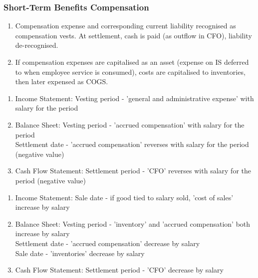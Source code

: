\subsubsection{Short-Term Benefits Compensation}

\begin{method} 
\begin{enumerate}[label=\roman*.]
\setlength{\itemsep}{0pt}
\item Compensation expense and corresponding current liability recognised as compensation vests. At settlement, cash is paid (as outflow in CFO), liability de-recognised.
\item If compensation expenses are capitalised as an asset (expense on IS deferred to when employee service is consumed), costs are capitalised to inventories, then later expensed as COGS.
\end{enumerate}
\end{method}

\begin{remark} 
\begin{enumerate}[label=\roman*.]
\setlength{\itemsep}{0pt}
\item Income Statement: Vesting period - 'general and administrative expense' with salary for the period
\item Balance Sheet: Vesting period - 'accrued compensation' with salary for the period\\
Settlement date - 'accrued compensation' reverses with salary for the period (negative value)
\item Cash Flow Statement: Settlement period - 'CFO' reverses with salary for the period (negative value)
\end{enumerate}
\end{remark}

\begin{remark} 
\begin{enumerate}[label=\roman*.]
\setlength{\itemsep}{0pt}
\item Income Statement: Sale date - if good tied to salary sold, 'cost of sales' increase by salary
\item Balance Sheet: Vesting period - 'inventory' and 'accrued compensation' both increase by salary\\
Settlement date - 'accrued compensation' decrease by salary\\
Sale date - 'inventories' decrease by salary
\item Cash Flow Statement: Settlement period - 'CFO' decrease by salary
\end{enumerate}
\end{remark}

